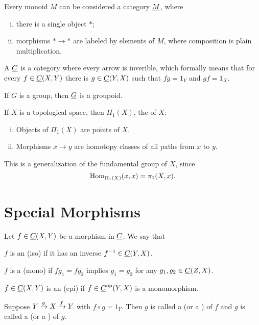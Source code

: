 \begin{examples*}
	\item Every monoid \( M \) can be considered a category \( \underline{M} \), where
		\begin{enumerate}[(i)]
			\item there is a single object \( \ast \);
			\item morphisms \( \ast \to \ast \) are labeled by elements of \( M \), where composition is plain multiplication.
		\end{enumerate}

		\begin{definition*}
			A  \( \underline{C} \) is a category where every arrow is inverible, which formally means that for every \( f \in \underline{C}(X, Y) \) there is \( g \in \underline{C}(Y, X) \) such that \( fg = 1_Y \) and \( gf = 1_X \).
		\end{definition*}

		\begin{example*}
			If \( G \) is a group, then \( \underline{G} \) is a groupoid.
		\end{example*}

	\item If \( X \) is a topological space, then \( \Pi_1(X) \), the  of \( X \):
		\begin{enumerate}[(i)]
			\item Objects of \( \Pi_1(X) \) are points of \( X \).
			\item Morphisms \( x \to y \) are homotopy classes of all paths from \( x \) to \( y \).
		\end{enumerate}
		This is a generalization of the fundamental group of \( X \), since
		\[
			\operatorname{Hom}_{\Pi_1(X)}(x, x) = \pi_1(X, x).
		\]
\end{examples*}

\section{Special Morphisms}

Let \( f \in \underline{C}(X, Y) \) be a morphism in \( \underline{C} \). We say that

\begin{definitions*}
	\item \( f \) is an  (iso) if it has an inverse \( f^{-1} \in \underline{C}(Y, X) \).
	\item \( f \) is a  (mono) if \( fg_1 = fg_2 \) implies \( g_1 = g_2 \) for any \( g_1, g_2 \in \underline{C}(Z, X) \).
	\item \( f \in \underline{C}(X, Y) \) is an  (epi) if \( f \in \underline{C}^\mathrm{op}(Y, X) \) is a monomorphism.
	\item Suppose \( Y \xrightarrow{g}  X \xrightarrow{f} Y \) with \( f \circ g = 1_Y \). Then \( g \) is called a  (or a ) of \( f \) and \( g \) is called a  (or a ) of \( g \).
\end{definitions*}

